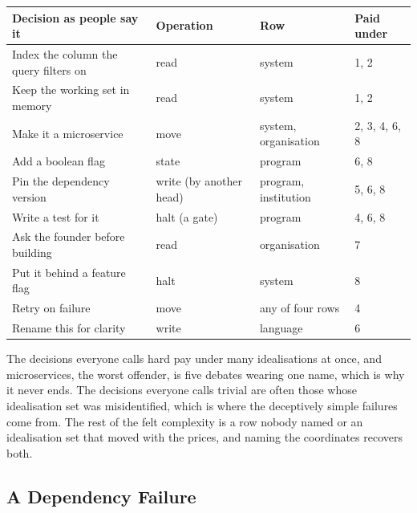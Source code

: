 \documentclass[11pt,oneside]{article}
\theoremstyle{definition}
\theoremstyle{remark}
\begin{document}
\begin{center}
\small
\begin{longtable}{@{}p{}p{}p{}p{}@{}}
\toprule
\textbf{Decision as people say it} & \textbf{Operation} & \textbf{Row} & \textbf{Paid
under} \\
\midrule
\endhead
Index the column the query filters on & read & system & 1, 2 \\
Keep the working set in memory & read & system & 1, 2 \\
Make it a microservice & move & system, organisation & 2, 3, 4, 6, 8 \\
Add a boolean flag & state & program & 6, 8 \\
Pin the dependency version & write (by another head) & program, institution & 5, 6, 8 \\
Write a test for it & halt (a gate) & program & 4, 6, 8 \\
Ask the founder before building & read & organisation & 7 \\
Put it behind a feature flag & halt & system & 8 \\
Retry on failure & move & any of four rows & 4 \\
Rename this for clarity & write & language & 6 \\
\bottomrule
\end{longtable}
\end{center}

The decisions everyone calls hard pay under many idealisations at once, and microservices,
the worst offender, is five debates wearing one name, which is why it never ends. The
decisions everyone calls trivial are often those whose idealisation set was misidentified,
which is where the deceptively simple failures come from. The rest of the felt
complexity is a row nobody named or an idealisation set that moved with the prices, and
naming the coordinates recovers both.

\subsection{A Dependency Failure}\label{sec:dependency}
\end{document}
